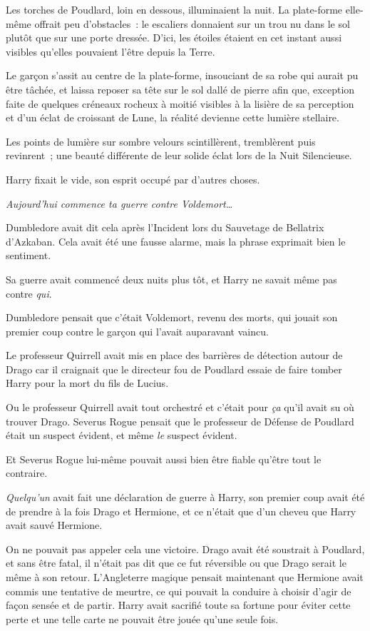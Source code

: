 Les torches de Poudlard, loin en dessous, illuminaient la nuit. La plate-forme elle-même offrait peu d'obstacles~: le escaliers donnaient sur un trou nu dans le sol plutôt que sur une porte dressée. D'ici, les étoiles étaient en cet instant aussi visibles qu'elles pouvaient l'être depuis la Terre.

Le garçon s'assit au centre de la plate-forme, insouciant de sa robe qui aurait pu être tâchée, et laissa reposer sa tête sur le sol dallé de pierre afin que, exception faite de quelques créneaux rocheux à moitié visibles à la lisière de sa perception et d'un éclat de croissant de Lune, la réalité devienne cette lumière stellaire.

Les points de lumière sur sombre velours scintillèrent, tremblèrent puis revinrent~; une beauté différente de leur solide éclat lors de la Nuit Silencieuse.

Harry fixait le vide, son esprit occupé par d'autres choses.

\emph{Aujourd'hui commence ta guerre contre Voldemort…}

Dumbledore avait dit cela après l'Incident lors du Sauvetage de Bellatrix d'Azkaban. Cela avait été une fausse alarme, mais la phrase exprimait bien le sentiment.

Sa guerre avait commencé deux nuits plus tôt, et Harry ne savait même pas contre \emph{qui}.

Dumbledore pensait que c'était Voldemort, revenu des morts, qui jouait son premier coup contre le garçon qui l'avait auparavant vaincu.

Le professeur Quirrell avait mis en place des barrières de détection autour de Drago car il craignait que le directeur fou de Poudlard essaie de faire tomber Harry pour la mort du fils de Lucius.

Ou le professeur Quirrell avait tout orchestré et c'était pour \emph{ça} qu'il avait su où trouver Drago. Severus Rogue pensait que le professeur de Défense de Poudlard était un suspect évident, et même \emph{le} suspect évident.

Et Severus Rogue lui-même pouvait aussi bien être fiable qu'être tout le contraire.

\emph{Quelqu'un} avait fait une déclaration de guerre à Harry, son premier coup avait été de prendre à la fois Drago et Hermione, et ce n'était que d'un cheveu que Harry avait sauvé Hermione.

On ne pouvait pas appeler cela une victoire. Drago avait été soustrait à Poudlard, et sans être fatal, il n'était pas dit que ce fut réversible ou que Drago serait le même à son retour. L'Angleterre magique pensait maintenant que Hermione avait commis une tentative de meurtre, ce qui pouvait la conduire à choisir d'agir de façon sensée et de partir. Harry avait sacrifié toute sa fortune pour éviter cette perte et une telle carte ne pouvait être jouée qu'une seule fois.


